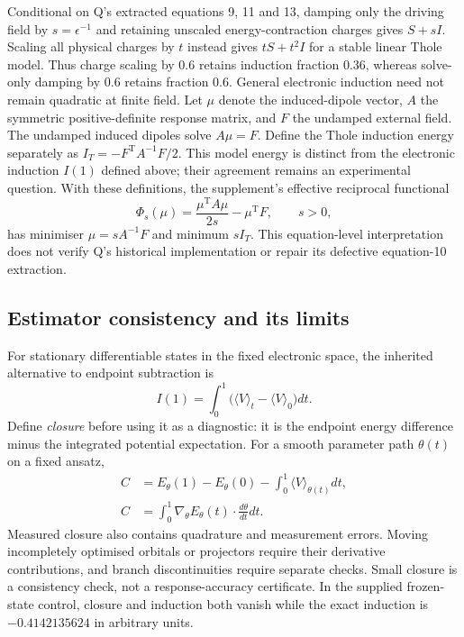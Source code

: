 \documentclass{article}
\begin{document}
Conditional on Q's extracted equations 9, 11 and 13, damping only the driving field by $s=\epsilon^{-1}$ and retaining unscaled energy-contraction charges gives $S+sI$. Scaling all physical charges by $t$ instead gives $tS+t^2I$ for a stable linear Thole model. Thus charge scaling by 0.6 retains induction fraction 0.36, whereas solve-only damping by 0.6 retains fraction 0.6. General electronic induction need not remain quadratic at finite field. Let $\mu$ denote the induced-dipole vector, $A$ the symmetric positive-definite response matrix, and $F$ the undamped external field. The undamped induced dipoles solve $A\mu=F$. Define the Thole induction energy separately as $I_T=-F^{\mathrm T}A^{-1}F/2$. This model energy is distinct from the electronic induction $I(1)$ defined above; their agreement remains an experimental question. With these definitions, the supplement's effective reciprocal functional
\begin{equation*}
\Phi_s(\mu)=\frac{\mu^{\mathrm T}A\mu}{2s}-\mu^{\mathrm T}F,\qquad s>0,
\end{equation*}
has minimiser $\mu=sA^{-1}F$ and minimum $sI_T$. This equation-level interpretation does not verify Q's historical implementation or repair its defective equation-10 extraction.

\subsection{Estimator consistency and its limits}

For stationary differentiable states in the fixed electronic space, the inherited alternative to endpoint subtraction is
\begin{equation*}
I(1)=\int_0^1\bigl(\langle V\rangle_t-\langle V\rangle_0\bigr)dt.
\end{equation*}
Define \emph{closure} before using it as a diagnostic: it is the endpoint energy difference minus the integrated potential expectation. For a smooth parameter path $\theta(t)$ on a fixed ansatz,
\begin{align*}
C&=E_\theta(1)-E_\theta(0)-\int_0^1\langle V\rangle_{\theta(t)}dt,\\
C&=\int_0^1\nabla_\theta E_\theta(t)\cdot\frac{d\theta}{dt}dt.
\end{align*}
Measured closure also contains quadrature and measurement errors. Moving incompletely optimised orbitals or projectors require their derivative contributions, and branch discontinuities require separate checks. Small closure is a consistency check, not a response-accuracy certificate. In the supplied frozen-state control, closure and induction both vanish while the exact induction is $-0.4142135624$ in arbitrary units.
\end{document}
